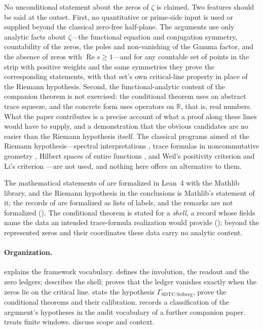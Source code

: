 \documentclass[11pt]{article}
\DeclareMathOperator{\Real}{Re}
\newcommand{\GamSDTCSelberg}{\Gamma_{\mathrm{SDTC\text{-}Selberg}}}
\theoremstyle{definition}
\begin{document}
No unconditional statement about the zeros of \(\zeta\) is claimed.
Two features should be said at the outset.  First, no quantitative or prime-side input is used or supplied beyond
the classical zero-free half-plane.  The arguments use
only analytic facts about \(\zeta\)---the functional equation and
conjugation symmetry, countability of the zeros, the poles and non-vanishing of the Gamma factor, and the absence of zeros with \(\Real s\geq1\)---and
for any countable set of points in the strip with positive weights and
the same symmetries they prove the corresponding statements, with that
set's own critical-line property in place of the Riemann hypothesis.  Second, the functional-analytic content of the
companion theorem is not exercised: the conditional theorem uses an
abstract trace squeeze, and the concrete form uses operators on
\(\mathbb R\), that is, real numbers.  What the paper contributes is a
precise account of what a proof along these lines would have to supply,
and a demonstration that the obvious candidates are no easier than the
Riemann hypothesis itself.  The classical programs aimed at the Riemann
hypothesis---spectral interpretations \citep{BerryKeating1990},
trace formulas in noncommutative geometry \citep{Connes1999}, Hilbert
spaces of entire functions \citep{deBranges1968,deBranges1986}, and
Weil's positivity criterion \citep{Weil1952,Bombieri2000} and Li's
criterion \citep{Li1997}---are not used, and nothing here offers an
alternative to them.

The mathematical statements of
are formalized in Lean~4 with the Mathlib library, and the Riemann
hypothesis in the conclusions is Mathlib's statement of it; the records
of  are formalized as lists of labels, and
the remarks are not formalized ().  The
conditional theorem is stated for a \emph{shell}, a record whose
fields name the data an intended trace-formula realization would
provide (); beyond the represented zeros and
their coordinates these data carry no analytic content.

\paragraph{Organization.}
 explains the framework vocabulary.
 defines the involution, the readout
and the zero ledgers;  describes the shell;
 proves that the ledger vanishes exactly
when the zeros lie on the critical line.
 state the hypothesis
\(\GamSDTCSelberg\), prove the conditional theorems and their
calibration.   records a classification of
the argument's hypotheses in the audit vocabulary of a further
companion paper.   treats finite windows.
 discuss
scope and context.
\end{document}
